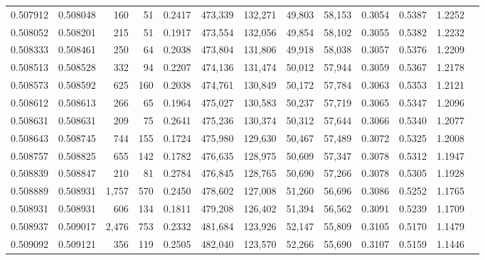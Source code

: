 \begin{tabular}{rrrrrrrrrrrrr}
0.507912 & 0.508048 &   160 &    51 &                                     0.2417 & 473,339 & 132,271 &  49,803 &  58,153 & 0.3054 & 0.5387 & 1.2252 \\
0.508052 & 0.508201 &   215 &    51 &                                     0.1917 & 473,554 & 132,056 &  49,854 &  58,102 & 0.3055 & 0.5382 & 1.2232 \\
0.508333 & 0.508461 &   250 &    64 &                                     0.2038 & 473,804 & 131,806 &  49,918 &  58,038 & 0.3057 & 0.5376 & 1.2209 \\
0.508513 & 0.508528 &   332 &    94 &                                     0.2207 & 474,136 & 131,474 &  50,012 &  57,944 & 0.3059 & 0.5367 & 1.2178 \\
0.508573 & 0.508592 &   625 &   160 &                                     0.2038 & 474,761 & 130,849 &  50,172 &  57,784 & 0.3063 & 0.5353 & 1.2121 \\
0.508612 & 0.508613 &   266 &    65 &                                     0.1964 & 475,027 & 130,583 &  50,237 &  57,719 & 0.3065 & 0.5347 & 1.2096 \\
0.508631 & 0.508631 &   209 &    75 &                                     0.2641 & 475,236 & 130,374 &  50,312 &  57,644 & 0.3066 & 0.5340 & 1.2077 \\
0.508643 & 0.508745 &   744 &   155 &                                     0.1724 & 475,980 & 129,630 &  50,467 &  57,489 & 0.3072 & 0.5325 & 1.2008 \\
0.508757 & 0.508825 &   655 &   142 &                                     0.1782 & 476,635 & 128,975 &  50,609 &  57,347 & 0.3078 & 0.5312 & 1.1947 \\
0.508839 & 0.508847 &   210 &    81 &                                     0.2784 & 476,845 & 128,765 &  50,690 &  57,266 & 0.3078 & 0.5305 & 1.1928 \\
0.508889 & 0.508931 & 1,757 &   570 &                                     0.2450 & 478,602 & 127,008 &  51,260 &  56,696 & 0.3086 & 0.5252 & 1.1765 \\
0.508931 & 0.508931 &   606 &   134 &                                     0.1811 & 479,208 & 126,402 &  51,394 &  56,562 & 0.3091 & 0.5239 & 1.1709 \\
0.508937 & 0.509017 & 2,476 &   753 &                                     0.2332 & 481,684 & 123,926 &  52,147 &  55,809 & 0.3105 & 0.5170 & 1.1479 \\
0.509092 & 0.509121 &   356 &   119 &                                     0.2505 & 482,040 & 123,570 &  52,266 &  55,690 & 0.3107 & 0.5159 & 1.1446 \\

\end{tabular}
